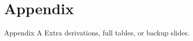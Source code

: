 \section*{Appendix}
\begin{frame}{Appendix A}
  Extra derivations, full tables, or backup slides.
\end{frame}
